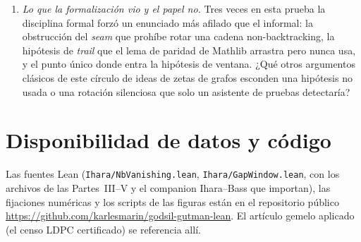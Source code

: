 \documentclass[11pt]{article}
\newcommand{\lean}[1]{\texttt{#1}}
\begin{document}
\begin{enumerate}
respondiendo. ¿En qué $k$ ---en general, no solo pasado $g+1$--- deja un grafo finito de ser
explicable por su propio recubridor universal?
\item \emph{Lo que la formalización vio y el papel no.} Tres veces en esta prueba la
disciplina formal forzó un enunciado más afilado que el informal: la obstrucción del
\emph{seam} que prohíbe rotar una cadena non-backtracking, la hipótesis de \emph{trail} que
el lema de paridad de Mathlib arrastra pero nunca usa, y el punto único donde entra la
hipótesis de ventana. ¿Qué otros argumentos clásicos de este círculo de ideas de zetas de
grafos esconden una hipótesis no usada o una rotación silenciosa que solo un asistente de
pruebas detectaría?
\end{enumerate}

\section*{Disponibilidad de datos y código}
Las fuentes Lean (\lean{Ihara/NbVanishing.lean}, \lean{Ihara/GapWindow.lean}, con los
archivos de las Partes~III--V y el companion Ihara--Bass que importan), las fijaciones
numéricas y los scripts de las
figuras están en el repositorio público
\url{https://github.com/karlesmarin/godsil-gutman-lean}. El artículo gemelo aplicado (el
censo LDPC certificado) se referencia allí.
\end{document}
